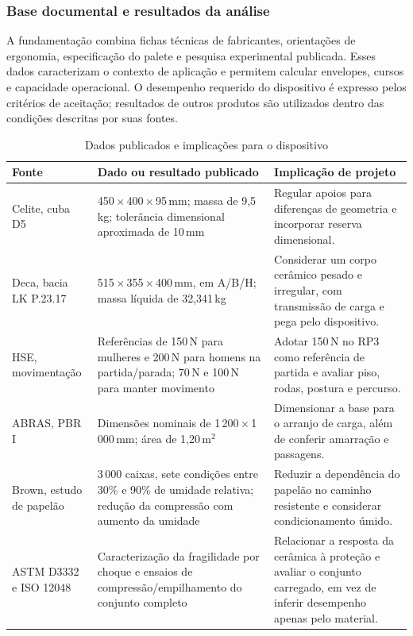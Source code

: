 \subsubsection{Base documental e resultados da análise}
\label{sec:validacao-metas}

A fundamentação combina fichas técnicas de fabricantes, orientações de ergonomia, especificação do palete e pesquisa experimental publicada. Esses dados caracterizam o contexto de aplicação e permitem calcular envelopes, cursos e capacidade operacional. O desempenho requerido do dispositivo é expresso pelos critérios de aceitação; resultados de outros produtos são utilizados dentro das condições descritas por suas fontes.

\begin{table}[H]
\caption{Dados publicados e implicações para o dispositivo}
\label{tab:base-documental}
\centering\footnotesize
\begin{tabularx}{\textwidth}{L{2.6cm}L{5.2cm}Y}
\toprule\textbf{Fonte}&\textbf{Dado ou resultado publicado}&\textbf{Implicação de projeto}\\\midrule
Celite, cuba D5&450\,$\times$\,400\,$\times$\,95\,mm; massa de 9,5\,kg; tolerância dimensional aproximada de 10\,mm&Regular apoios para diferenças de geometria e incorporar reserva dimensional.\\
Deca, bacia LK P.23.17&515\,$\times$\,355\,$\times$\,400\,mm, em A/B/H; massa líquida de 32,341\,kg&Considerar um corpo cerâmico pesado e irregular, com transmissão de carga e pega pelo dispositivo.\\
HSE, movimentação&Referências de 150\,N para mulheres e 200\,N para homens na partida/parada; 70\,N e 100\,N para manter movimento&Adotar 150\,N no RP3 como referência de partida e avaliar piso, rodas, postura e percurso.\\
ABRAS, PBR I&Dimensões nominais de 1\,200\,$\times$\,1\,000\,mm; área de 1,20\,m$^2$&Dimensionar a base para o arranjo de carga, além de conferir amarração e passagens.\\
Brown, estudo de papelão&3\,000 caixas, sete condições entre 30\% e 90\% de umidade relativa; redução da compressão com aumento da umidade&Reduzir a dependência do papelão no caminho resistente e considerar condicionamento úmido.\\
ASTM D3332 e ISO 12048&Caracterização da fragilidade por choque e ensaios de compressão/empilhamento do conjunto completo&Relacionar a resposta da cerâmica à proteção e avaliar o conjunto carregado, em vez de inferir desempenho apenas pelo material.\\
\bottomrule\end{tabularx}
\end{table}

